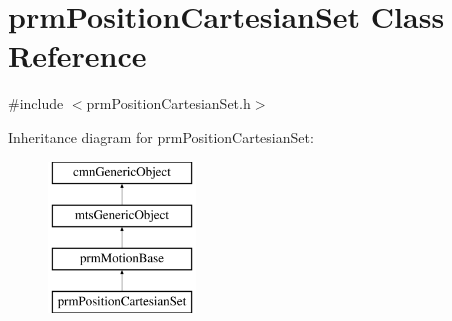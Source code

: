 \hypertarget{classprm_position_cartesian_set}{}\section{prm\+Position\+Cartesian\+Set Class Reference}
\label{classprm_position_cartesian_set}


{\ttfamily \#include $<$prm\+Position\+Cartesian\+Set.\+h$>$}

Inheritance diagram for prm\+Position\+Cartesian\+Set\+:\begin{figure}[H]
\begin{center}
\leavevmode
\includegraphics[height=4.000000cm]{d9/d6e/classprm_position_cartesian_set}
\end{center}
\end{figure}
